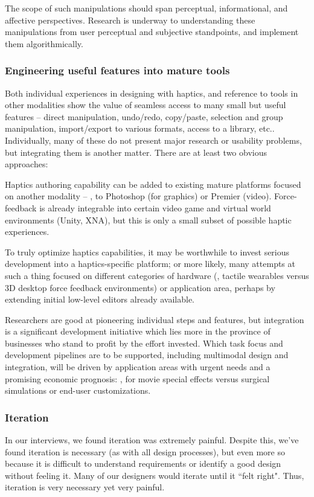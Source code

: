 The scope of such manipulations should span perceptual, informational, and affective perspectives. Research is underway to understanding these manipulations from user perceptual and subjective standpoints, and implement them algorithmically. 


%
%
\subsubsection{Engineering useful features into mature tools} 
Both individual experiences in designing with haptics, and reference to tools in other modalities show the value of seamless access to many small but useful features --
direct manipulation, undo/redo, copy/paste, selection and group manipulation, import/export to various formats, access to a library, etc..
%
Individually, many of these do not present major research or usability problems, but integrating them is another matter. There are at least two obvious approaches:

    Haptics authoring capability can be added to existing mature platforms focused on another modality -- \eg, to Photoshop (for graphics)  or Premier (video).
    Force-feedback is already integrable into certain video game and virtual world environments (Unity, XNA), but this is only a small subset of possible haptic experiences.

    To truly optimize haptics capabilities, it may be worthwhile to invest serious development into a haptics-specific platform; or more likely, many attempts at such a thing focused on different categories of hardware (\eg, tactile wearables versus 3D desktop force feedback environments) or application area, perhaps by extending initial low-level editors already available.

\vspace{0.1in} \noindent 
Researchers are good at pioneering individual steps and features, but integration is a significant development initiative which lies more in the province of businesses who stand to profit by the effort invested. 
Which task focus and development pipelines are to be supported, including multimodal design and integration,  will be driven by application areas with urgent needs and a promising economic prognosis:  \eg, for movie special effects versus surgical simulations or end-user customizations.


%
%
\subsubsection{Iteration}
In our interviews, we found iteration was extremely painful.
Despite this, we've found iteration is necessary (as with all design processes), but even more so because it is difficult to understand requirements or identify a good design without feeling it.
Many of our designers would iterate until it ``felt right".
Thus, iteration is very necessary yet very painful.




